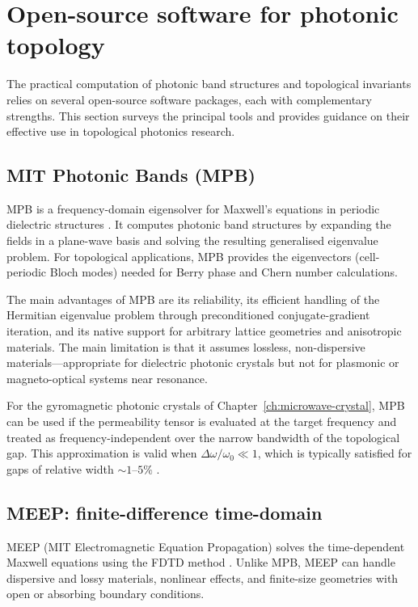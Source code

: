 \section{Open-source software for photonic topology}
\label{sec:appC-software}

The practical computation of photonic band structures and topological
invariants relies on several open-source software packages, each
with complementary strengths.  This section surveys the principal
tools and provides guidance on their effective use in topological
photonics research.

\subsection{MIT Photonic Bands (MPB)}
\label{sec:appC-mpb-software}

MPB is a frequency-domain eigensolver for Maxwell's equations in
periodic dielectric structures \cite{press2026photonic,initio2026pdf}.
It computes photonic band structures by expanding the fields in a
plane-wave basis and solving the resulting generalised eigenvalue
problem.  For topological applications, MPB provides the eigenvectors
(cell-periodic Bloch modes) needed for Berry phase and Chern number
calculations.

The main advantages of MPB are its reliability, its efficient
handling of the Hermitian eigenvalue problem through preconditioned
conjugate-gradient iteration, and its native support for arbitrary
lattice geometries and anisotropic materials.  The main limitation
is that it assumes lossless, non-dispersive materials---appropriate
for dielectric photonic crystals but not for plasmonic or
magneto-optical systems near resonance.

For the gyromagnetic photonic crystals of
Chapter~\ref{ch:microwave-crystal}, MPB can be used if the
permeability tensor is evaluated at the target frequency and treated
as frequency-independent over the narrow bandwidth of the topological
gap.  This approximation is valid when
$\Delta\omega/\omega_0 \ll 1$, which is typically satisfied for
gaps of relative width $\sim 1$--$5\%$ \cite{zhao2020first}.

\subsection{MEEP: finite-difference time-domain}
\label{sec:appC-meep-fdtd}

MEEP (MIT Electromagnetic Equation Propagation) solves the
time-dependent Maxwell equations using the FDTD method
\cite{press2026photonic}.  Unlike MPB, MEEP can handle dispersive and
lossy materials, nonlinear effects, and finite-size geometries with
open or absorbing boundary conditions.

